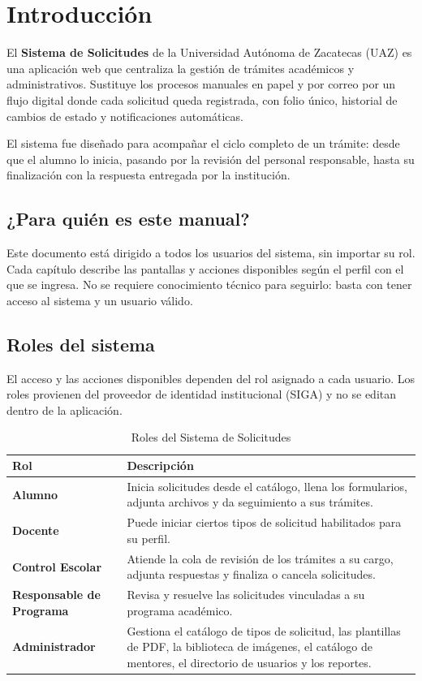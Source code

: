 \documentclass[12pt,letterpaper]{report}
\begin{document}
\tableofcontents\newpage

\chapter{Introducción}

El \textbf{Sistema de Solicitudes} de la Universidad Autónoma de Zacatecas
(UAZ) es una aplicación web que centraliza la gestión de trámites académicos
y administrativos. Sustituye los procesos manuales en papel y por correo por
un flujo digital donde cada solicitud queda registrada, con folio único,
historial de cambios de estado y notificaciones automáticas.

El sistema fue diseñado para acompañar el ciclo completo de un trámite: desde
que el alumno lo inicia, pasando por la revisión del personal responsable,
hasta su finalización con la respuesta entregada por la institución.

\section{¿Para quién es este manual?}

Este documento está dirigido a todos los usuarios del sistema, sin importar su
rol. Cada capítulo describe las pantallas y acciones disponibles según el
perfil con el que se ingresa. No se requiere conocimiento técnico para
seguirlo: basta con tener acceso al sistema y un usuario válido.

\section{Roles del sistema}

El acceso y las acciones disponibles dependen del rol asignado a cada usuario.
Los roles provienen del proveedor de identidad institucional (SIGA) y no se
editan dentro de la aplicación.

\begin{table}[H]
\centering
\caption{Roles del Sistema de Solicitudes}
\begin{tabularx}{\textwidth}{>{\bfseries}l X}
\toprule
Rol & Descripción \\
\midrule
Alumno &
  Inicia solicitudes desde el catálogo, llena los formularios, adjunta
  archivos y da seguimiento a sus trámites. \\
Docente &
  Puede iniciar ciertos tipos de solicitud habilitados para su perfil. \\
Control Escolar &
  Atiende la cola de revisión de los trámites a su cargo, adjunta respuestas
  y finaliza o cancela solicitudes. \\
Responsable de Programa &
  Revisa y resuelve las solicitudes vinculadas a su programa académico. \\
Administrador &
  Gestiona el catálogo de tipos de solicitud, las plantillas de PDF, la
  biblioteca de imágenes, el catálogo de mentores, el directorio de usuarios
  y los reportes. \\
\bottomrule
\end{tabularx}
\end{table}
\end{document}
